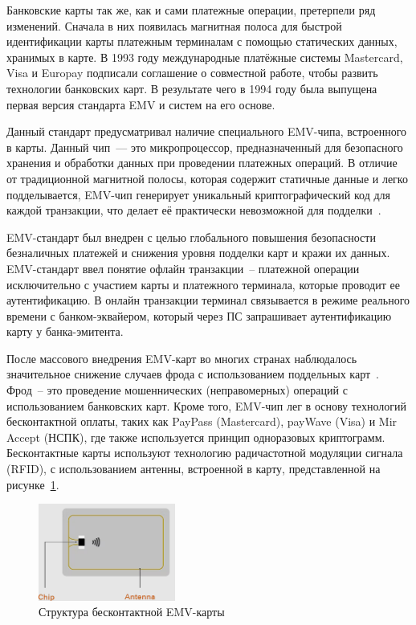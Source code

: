 Банковские карты так же, как и сами платежные операции, претерпели ряд изменений.
Сначала в них появилась магнитная полоса для быстрой идентификации карты платежным терминалам с помощью статических данных, хранимых в карте.
В 1993 году международные платёжные системы Mastercard, Visa и Europay подписали соглашение о совместной работе, чтобы развить технологии банковских карт.
В результате чего в 1994 году была выпущена первая версия стандарта EMV и систем на его основе.

Данный стандарт предусматривал наличие специального EMV-чипа, встроенного в карты.
Данный чип~--- это микропроцессор, предназначенный для безопасного хранения и обработки данных при проведении платежных операций.
В отличие от традиционной магнитной полосы, которая содержит статичные данные и легко подделывается, EMV-чип генерирует уникальный криптографический код для каждой транзакции, что делает её практически невозможной для подделки~\cite{emv_specifications_book}.

EMV-стандарт был внедрен с целью глобального повышения безопасности безналичных платежей и снижения уровня подделки карт и кражи их данных.
EMV-стандарт ввел понятие офлайн транзакции~-- платежной операции исключительно с участием карты и платежного терминала, которые проводит ее аутентификацию.
В онлайн транзакции терминал связывается в режиме реального времени с банком-эквайером, который через ПС запрашивает аутентификацию карту у банка-эмитента.

После массового внедрения EMV-карт во многих странах наблюдалось значительное снижение случаев фрода с использованием поддельных карт~\cite{plas_emv_fraud}.
Фрод~-- это проведение мошеннических (неправомерных) операций с использованием банковских карт.
Кроме того, EMV-чип лег в основу технологий бесконтактной оплаты, таких как PayPass (Mastercard), payWave (Visa) и Mir Accept (НСПК), где также используется принцип одноразовых криптограмм.
Бесконтактные карты используют технологию радичастотной модуляции сигнала (RFID), с использованием антенны, встроенной в карту, представленной на рисунке~\ref{fig:emv_card}.

\begin{figure}[H]
    \centering
    \includegraphics[width=0.4\textwidth]{images/research/emv_card}
    \caption{\centering Структура бесконтактной EMV-карты}
    \label{fig:emv_card}
\end{figure}

